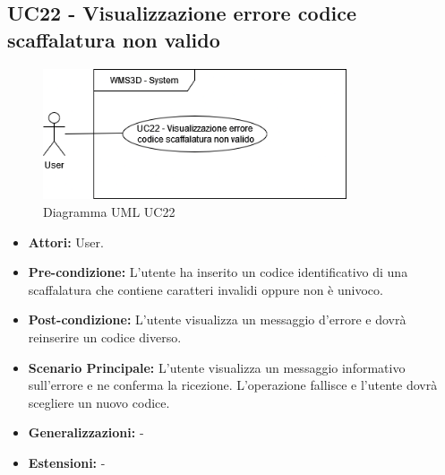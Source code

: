 \subsection{UC22 - Visualizzazione errore codice scaffalatura non valido}
\begin{figure}[H]
  \centering
  \includegraphics[width=0.8\textwidth]{UC_diagrams_21-26/UC22.drawio.png}
   \caption{Diagramma UML UC22}
\end{figure}
\begin{itemize}
    \item \textbf{Attori:} User.
    \item \textbf{Pre-condizione:}  L'utente ha inserito un codice identificativo di una scaffalatura che contiene caratteri invalidi oppure non è univoco.
    \item \textbf{Post-condizione:}  L'utente visualizza un messaggio d'errore e dovrà reinserire un codice diverso.
    \item \textbf{Scenario Principale:}  L'utente visualizza un messaggio informativo sull'errore e ne conferma la ricezione. L'operazione fallisce e l'utente dovrà scegliere un nuovo codice.
    \item \textbf{Generalizzazioni:} -
    \item \textbf{Estensioni:} -
\end{itemize}